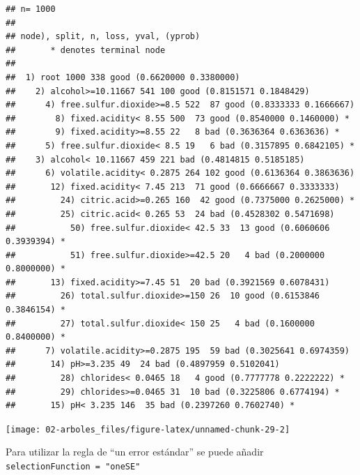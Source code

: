 \documentclass[
  spanish,
]{book}
\newenvironment{Shaded}{\begin{snugshade}}{\end{snugshade}}
\newcommand{\AttributeTok}[1]{\textcolor[rgb]{0.77,0.63,0.00}{#1}}
\newcommand{\FunctionTok}[1]{\textcolor[rgb]{0.00,0.00,0.00}{#1}}
\newcommand{\NormalTok}[1]{#1}
\newcommand{\SpecialCharTok}[1]{\textcolor[rgb]{0.00,0.00,0.00}{#1}}
\newcommand{\StringTok}[1]{\textcolor[rgb]{0.31,0.60,0.02}{#1}}
\theoremstyle{break}
\theoremstyle{definition}
\theoremstyle{definition}
\theoremstyle{definition}
\theoremstyle{definition}
\theoremstyle{remark}
\begin{document}
\begin{verbatim}
## n= 1000 
## 
## node), split, n, loss, yval, (yprob)
##       * denotes terminal node
## 
##  1) root 1000 338 good (0.6620000 0.3380000)  
##    2) alcohol>=10.11667 541 100 good (0.8151571 0.1848429)  
##      4) free.sulfur.dioxide>=8.5 522  87 good (0.8333333 0.1666667)  
##        8) fixed.acidity< 8.55 500  73 good (0.8540000 0.1460000) *
##        9) fixed.acidity>=8.55 22   8 bad (0.3636364 0.6363636) *
##      5) free.sulfur.dioxide< 8.5 19   6 bad (0.3157895 0.6842105) *
##    3) alcohol< 10.11667 459 221 bad (0.4814815 0.5185185)  
##      6) volatile.acidity< 0.2875 264 102 good (0.6136364 0.3863636)  
##       12) fixed.acidity< 7.45 213  71 good (0.6666667 0.3333333)  
##         24) citric.acid>=0.265 160  42 good (0.7375000 0.2625000) *
##         25) citric.acid< 0.265 53  24 bad (0.4528302 0.5471698)  
##           50) free.sulfur.dioxide< 42.5 33  13 good (0.6060606 0.3939394) *
##           51) free.sulfur.dioxide>=42.5 20   4 bad (0.2000000 0.8000000) *
##       13) fixed.acidity>=7.45 51  20 bad (0.3921569 0.6078431)  
##         26) total.sulfur.dioxide>=150 26  10 good (0.6153846 0.3846154) *
##         27) total.sulfur.dioxide< 150 25   4 bad (0.1600000 0.8400000) *
##      7) volatile.acidity>=0.2875 195  59 bad (0.3025641 0.6974359)  
##       14) pH>=3.235 49  24 bad (0.4897959 0.5102041)  
##         28) chlorides< 0.0465 18   4 good (0.7777778 0.2222222) *
##         29) chlorides>=0.0465 31  10 bad (0.3225806 0.6774194) *
##       15) pH< 3.235 146  35 bad (0.2397260 0.7602740) *
\end{verbatim}

\begin{Shaded}
\end{Shaded}

\begin{center}\texttt{[image: 02-arboles\_files/figure-latex/unnamed-chunk-29-2]} \end{center}

Para utilizar la regla de ``un error estándar'' se puede añadir \texttt{selectionFunction\ =\ "oneSE"}
\end{document}
